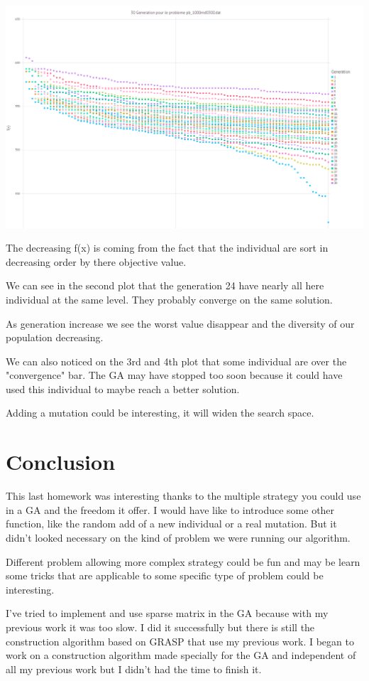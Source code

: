 \documentclass[12pt]{article}
\begin{document}
\begin{center}
		\includegraphics[scale=0.5]{1000rnd0300.png}
	\end{center}
	The decreasing f(x) is coming from the fact that the individual are sort in decreasing order by there objective value.
	
	We can see in the second plot that the generation 24 have nearly all here individual at the same level. They probably converge on the same solution.
	
	As generation increase we see the worst value disappear and the diversity of our population decreasing.
	
	We can also noticed on the 3rd and 4th plot that some individual are over the "convergence" bar. The GA may have stopped too soon because it could have used this individual to maybe reach a better solution.
	
	Adding a mutation could be interesting, it will widen the search space.
	
	\section{Conclusion}
	
	This last homework was interesting thanks to the multiple strategy you could use in a GA and the freedom it offer. I would have like to introduce some other function, like the random add of a new individual or a real mutation. But it didn't looked necessary on the kind of problem we were running our algorithm.
	
	Different problem allowing more complex strategy could be fun and may be learn some tricks that are applicable to some specific type of problem could be interesting. 
	
	I've tried to implement and use sparse matrix in the GA because with my previous work it was too slow. I did it successfully but there is still the construction algorithm based on GRASP that use my previous work. I began to work on a construction algorithm made specially for the GA and independent of all my previous work but I didn't had the time to finish it.
	
\end{document}
